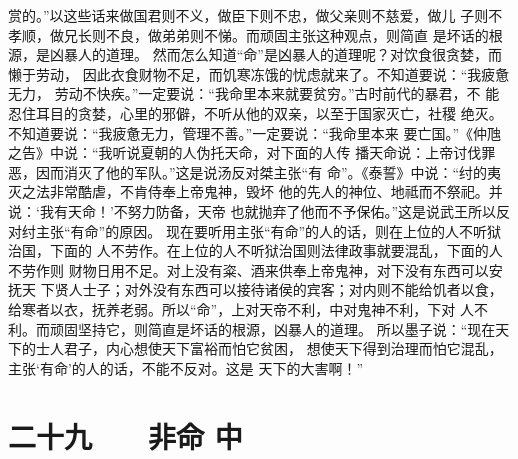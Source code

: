 \documentclass[12pt,UTF8]{ctexbook}
\begin{document}
赏的。”以这些话来做国君则不义，做臣下则不忠，做父亲则不慈爱，做儿 
子则不孝顺，做兄长则不良，做弟弟则不悌。而顽固主张这种观点，则简直 
是坏话的根源，是凶暴人的道理。 
然而怎么知道“命”是凶暴人的道理呢？对饮食很贪婪，而懒于劳动， 
因此衣食财物不足，而饥寒冻饿的忧虑就来了。不知道要说：“我疲惫无力， 
劳动不快疾。”一定要说：“我命里本来就要贫穷。”古时前代的暴君，不 
能忍住耳目的贪婪，心里的邪僻，不听从他的双亲，以至于国家灭亡，社稷 
绝灭。不知道要说：“我疲惫无力，管理不善。”一定要说：“我命里本来 
要亡国。”《仲虺之告》中说：“我听说夏朝的人伪托天命，对下面的人传 
播天命说：上帝讨伐罪恶，因而消灭了他的军队。”这是说汤反对桀主张“有 
命”。《泰誓》中说：“纣的夷灭之法非常酷虐，不肯侍奉上帝鬼神，毁坏 
他的先人的神位、地祗而不祭祀。并说：‘我有天命！’不努力防备，天帝 
也就抛弃了他而不予保佑。”这是说武王所以反对纣主张“有命”的原因。 
现在要听用主张“有命”的人的话，则在上位的人不听狱治国，下面的 
人不劳作。在上位的人不听狱治国则法律政事就要混乱，下面的人不劳作则 
财物日用不足。对上没有粢、酒来供奉上帝鬼神，对下没有东西可以安抚天 
下贤人士子；对外没有东西可以接待诸侯的宾客；对内则不能给饥者以食， 
给寒者以衣，抚养老弱。所以“命”，上对天帝不利，中对鬼神不利，下对 
人不利。而顽固坚持它，则简直是坏话的根源，凶暴人的道理。 
所以墨子说：“现在天下的士人君子，内心想使天下富裕而怕它贫困， 
想使天下得到治理而怕它混乱，主张‘有命’的人的话，不能不反对。这是 
天下的大害啊！” 


\chapter{二十九　　非命 中}
\end{document}
